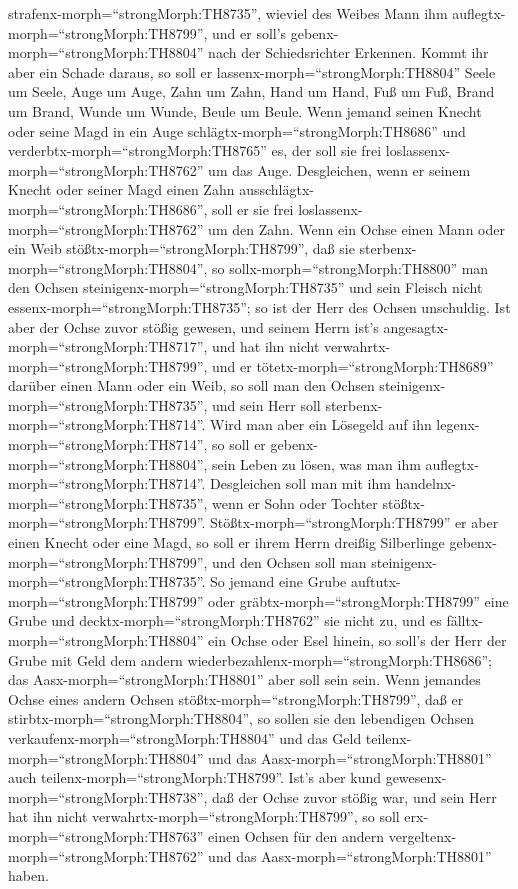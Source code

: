 strafenx-morph=``strongMorph:TH8735'', wieviel des Weibes Mann ihm
auflegtx-morph=``strongMorph:TH8799'', und er soll's
gebenx-morph=``strongMorph:TH8804'' nach der Schiedsrichter Erkennen.
 Kommt ihr aber ein Schade daraus, so soll er
lassenx-morph=``strongMorph:TH8804'' Seele um Seele,  Auge
um Auge, Zahn um Zahn, Hand um Hand, Fuß um Fuß,  Brand um
Brand, Wunde um Wunde, Beule um Beule.  Wenn jemand seinen
Knecht oder seine Magd in ein Auge schlägtx-morph=``strongMorph:TH8686''
und verderbtx-morph=``strongMorph:TH8765'' es, der soll sie frei
loslassenx-morph=``strongMorph:TH8762'' um das Auge. 
Desgleichen, wenn er seinem Knecht oder seiner Magd einen Zahn
ausschlägtx-morph=``strongMorph:TH8686'', soll er sie frei
loslassenx-morph=``strongMorph:TH8762'' um den Zahn.  Wenn
ein Ochse einen Mann oder ein Weib stößtx-morph=``strongMorph:TH8799'',
daß sie sterbenx-morph=``strongMorph:TH8804'', so
sollx-morph=``strongMorph:TH8800'' man den Ochsen
steinigenx-morph=``strongMorph:TH8735'' und sein Fleisch nicht
essenx-morph=``strongMorph:TH8735''; so ist der Herr des Ochsen
unschuldig.  Ist aber der Ochse zuvor stößig gewesen, und
seinem Herrn ist's angesagtx-morph=``strongMorph:TH8717'', und hat ihn
nicht verwahrtx-morph=``strongMorph:TH8799'', und er
tötetx-morph=``strongMorph:TH8689'' darüber einen Mann oder ein Weib, so
soll man den Ochsen steinigenx-morph=``strongMorph:TH8735'', und sein
Herr soll sterbenx-morph=``strongMorph:TH8714''.  Wird man
aber ein Lösegeld auf ihn legenx-morph=``strongMorph:TH8714'', so soll
er gebenx-morph=``strongMorph:TH8804'', sein Leben zu lösen, was man ihm
auflegtx-morph=``strongMorph:TH8714''.  Desgleichen soll
man mit ihm handelnx-morph=``strongMorph:TH8735'', wenn er Sohn oder
Tochter stößtx-morph=``strongMorph:TH8799''. 
Stößtx-morph=``strongMorph:TH8799'' er aber einen Knecht oder eine Magd,
so soll er ihrem Herrn dreißig Silberlinge
gebenx-morph=``strongMorph:TH8799'', und den Ochsen soll man
steinigenx-morph=``strongMorph:TH8735''.  So jemand eine
Grube auftutx-morph=``strongMorph:TH8799'' oder
gräbtx-morph=``strongMorph:TH8799'' eine Grube und
decktx-morph=``strongMorph:TH8762'' sie nicht zu, und es
fälltx-morph=``strongMorph:TH8804'' ein Ochse oder Esel hinein,
 so soll's der Herr der Grube mit Geld dem andern
wiederbezahlenx-morph=``strongMorph:TH8686''; das
Aasx-morph=``strongMorph:TH8801'' aber soll sein sein. 
Wenn jemandes Ochse eines andern Ochsen
stößtx-morph=``strongMorph:TH8799'', daß er
stirbtx-morph=``strongMorph:TH8804'', so sollen sie den lebendigen
Ochsen verkaufenx-morph=``strongMorph:TH8804'' und das Geld
teilenx-morph=``strongMorph:TH8804'' und das
Aasx-morph=``strongMorph:TH8801'' auch
teilenx-morph=``strongMorph:TH8799''.  Ist's aber kund
gewesenx-morph=``strongMorph:TH8738'', daß der Ochse zuvor stößig war,
und sein Herr hat ihn nicht verwahrtx-morph=``strongMorph:TH8799'', so
soll erx-morph=``strongMorph:TH8763'' einen Ochsen für den andern
vergeltenx-morph=``strongMorph:TH8762'' und das
Aasx-morph=``strongMorph:TH8801'' haben.

